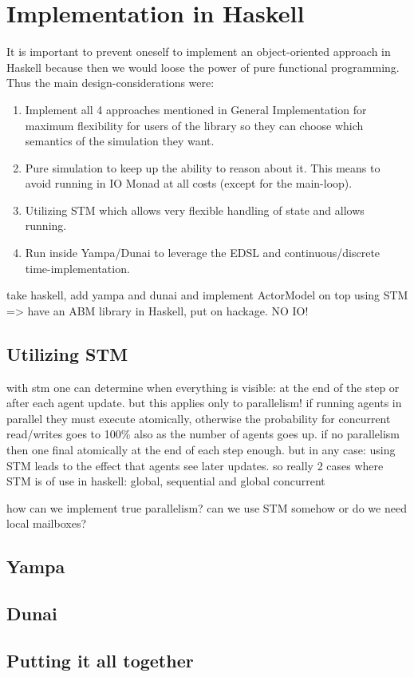 \section{Implementation in Haskell}
It is important to prevent oneself to implement an object-oriented approach in Haskell because then we would loose the power of pure functional programming. Thus the main design-considerations were:

\begin{enumerate}
\item Implement all 4 approaches mentioned in General Implementation for maximum flexibility for users of the library so they can choose which semantics of the simulation they want.
\item Pure simulation to keep up the ability to reason about it. This means to avoid running in IO Monad at all costs (except for the main-loop).
\item Utilizing STM which allows very flexible handling of state and allows running.
\item Run inside Yampa/Dunai to leverage the EDSL and continuous/discrete time-implementation.
\end{enumerate}

take haskell, add yampa and dunai and implement ActorModel on top using STM => have an ABM library in Haskell, put on hackage. NO IO!

\subsection{Utilizing STM}
with stm one can determine when everything is visible: at the end of the step or after each agent update. but this applies only to parallelism! if running agents in parallel they must execute atomically, otherwise the probability for concurrent read/writes goes to 100\% also as the number of agents goes up. if no parallelism then one final atomically at the end of each step enough. but in any case: using STM leads to the effect that agents see later updates. so really 2 cases where STM is of use in haskell: global, sequential and global concurrent

how can we implement true parallelism? can we use STM somehow or do we need local mailboxes?
\subsection{Yampa}

\subsection{Dunai}

\subsection{Putting it all together}